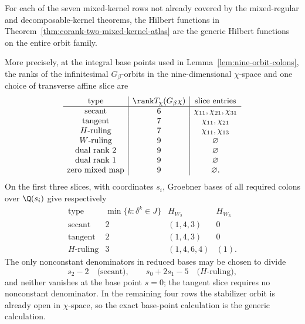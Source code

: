 \begin{theorem}
\label{thm:generic-slice-certification}
For each of the seven mixed-kernel rows not already covered by the
mixed-regular and decomposable-kernel theorems, the Hilbert functions
in Theorem~\ref{thm:corank-two-mixed-kernel-atlas} are the generic
Hilbert functions on the entire orbit family.

More precisely, at the integral base points used in
Lemma~\ref{lem:nine-orbit-colons}, the ranks of the infinitesimal
\(G_\beta\)-orbits in the nine-dimensional \(\chi\)-space and
one choice of transverse affine slice are
\[
\begin{array}{c|c|c}
\text{type}&\rank T_{\chi}(G_\beta\chi)&\text{slice entries}\\ \hline
\text{secant}&6&\chi_{11},\chi_{21},\chi_{31}\\
\text{tangent}&7&\chi_{11},\chi_{21}\\
H\text{-ruling}&7&\chi_{11},\chi_{13}\\
W\text{-ruling}&9&\varnothing\\
\text{dual rank }2&9&\varnothing\\
\text{dual rank }1&9&\varnothing\\
\text{zero mixed map}&9&\varnothing.
\end{array}
\]
On the first three slices, with coordinates \(s_i\), Groebner
bases of all required colons over \(\Q(s_i)\) give respectively
\[
\begin{array}{c|c|c|c}
\text{type}&\min\{k:\delta^k\in J\}&H_{W_2}&H_{W_3}\\ \hline
\text{secant}&2&(1,4,3)&0\\
\text{tangent}&2&(1,4,3)&0\\
H\text{-ruling}&3&(1,4,6,4)&(1).
\end{array}
\]
The only nonconstant denominators in reduced bases may be chosen to
divide
\[
 s_2-2\quad\text{(secant)},\qquad
 s_0+2s_1-5\quad\text{(\(H\)-ruling)},
\]
and neither vanishes at the base point \(s=0\); the tangent slice
requires no nonconstant denominator.  In the remaining four rows the
stabilizer orbit is already open in \(\chi\)-space, so the exact
base-point calculation is the generic calculation.
\end{theorem}


